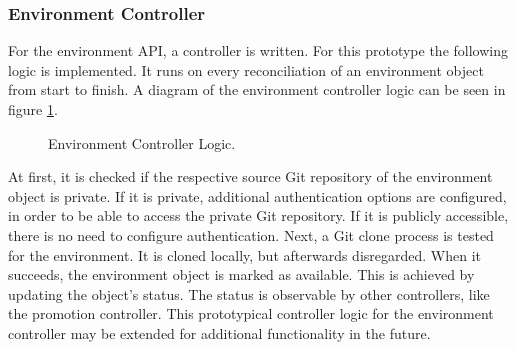 \newpage

\subsubsection*{Environment Controller}

For the environment API,
a controller is written.
For this prototype the following logic is implemented.
It runs on every reconciliation of an environment object from start to finish.
A diagram of the environment controller logic can be seen in figure \ref{tikz:environment-controller-logic}.

\begin{figure}[h]
\centering
{}
\caption{Environment Controller Logic.} \label{tikz:environment-controller-logic}
\end{figure}

At first, it is checked if the respective source Git repository
of the environment object is private.
If it is private,
additional authentication options are configured,
in order to be able to access the private Git repository.
If it is publicly accessible, there is no need to configure authentication.
Next, a Git clone process is tested for the environment.
It is cloned locally, but afterwards disregarded.
When it succeeds,
the environment object is marked as available.
This is achieved by updating the object's status.
The status is observable by other controllers, like the promotion controller.
This prototypical controller logic for the environment controller
may be extended for additional functionality in the future.

